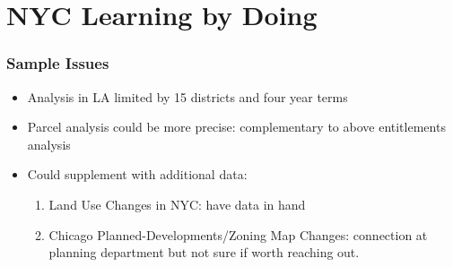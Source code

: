 \documentclass{beamer}
\begin{document}
\section{NYC Learning by Doing}
\begin{frame}
    \frametitle{Sample Issues}
    \begin{itemize}
        \item Analysis in LA limited by 15 districts and four year terms
        \item Parcel analysis could be more precise: complementary to above entitlements analysis
        \item Could supplement with additional data:
        \begin{enumerate}
            \item Land Use Changes in NYC: have data in hand
            \item Chicago Planned-Developments/Zoning Map Changes: connection at planning department but not sure if worth reaching out.
        \end{enumerate}
    \end{itemize}
\end{frame}
\end{document}
